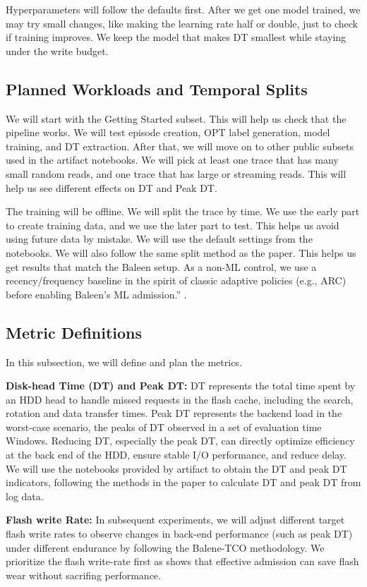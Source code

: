 Hyperparameters will follow the defaults first. After we get one model
trained, we may try small changes, like making the learning rate half
or double, just to check if training improves. We keep the model that
makes DT smallest while staying under the write budget.


\subsection{Planned Workloads and Temporal Splits}
We will start with the Getting Started subset. This will help us check that the pipeline works. We will test episode creation, OPT label generation, model training, and DT extraction. After that, we will move on to other public subsets used in the artifact notebooks. We will pick at least one trace that has many small random reads, and one trace that has large or streaming reads. This will help us see different effects on DT and Peak DT.

The training will be offline. We will split the trace by time. We use the early part to create training data, and we use the later part to test. This helps us avoid using future data by mistake. We will use the default settings from the notebooks. We will also follow the same split method as the paper. This helps us get results that match the Baleen setup. As a non-ML control, we use a recency/frequency baseline in the spirit of classic adaptive policies (e.g., ARC) before enabling Baleen’s ML admission.” \cite{megiddo2003arc}.


\subsection{Metric Definitions}

In this subsection, we will define and plan the metrics.

\textbf{Disk-head Time (DT) and Peak DT:}
DT represents the total time spent by an HDD head to handle missed requests in the flash cache, including the search, rotation and data transfer times. Peak DT represents the backend load in the worst-case scenario, the peaks of DT observed in a set of evaluation time Windows.
Reducing DT, especially the peak DT, can directly optimize efficiency at the back end of the HDD, ensure stable I/O performance, and reduce delay.
We will use the notebooks provided by artifact to obtain the DT and peak DT indicators, following the methods in the paper to calculate DT and peak DT from log data.

\textbf{Flash write Rate:}
In subsequent experiments, we will adjust different target flash write rates to observe changes in back-end performance (such as peak DT) under different endurance by following the Balene-TCO methodology. We prioritize the flash write-rate first as \cite{eisenman2019flashield} shows that effective admission can save flash wear without sacrifing performance. 

